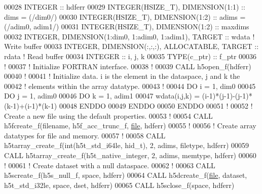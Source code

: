 \begin{DoxyCode}
00028   \textcolor{keywordtype}{INTEGER} :: hdferr
00029   \textcolor{keywordtype}{INTEGER(HSIZE\_T)}, \textcolor{keywordtype}{DIMENSION(1:1)}   :: dims = (/dim0/)
00030   \textcolor{keywordtype}{INTEGER(HSIZE\_T)}, \textcolor{keywordtype}{DIMENSION(1:2)}   :: adims = (/adim0, adim1/)
00031   \textcolor{keywordtype}{INTEGER(HSIZE\_T)}, \textcolor{keywordtype}{DIMENSION(1:2)}   :: maxdims
00032   \textcolor{keywordtype}{INTEGER}, \textcolor{keywordtype}{DIMENSION(1:dim0, 1:adim0, 1:adim1)}, \textcolor{keywordtype}{TARGET} :: wdata \textcolor{comment}{! Write buffer }
00033   \textcolor{keywordtype}{INTEGER}, \textcolor{keywordtype}{DIMENSION(:,:,:)}, \textcolor{keywordtype}{ALLOCATABLE}, \textcolor{keywordtype}{TARGET} :: rdata    \textcolor{comment}{! Read buffer}
00034   \textcolor{keywordtype}{INTEGER} :: i, j, k
00035   \textcolor{keywordtype}{TYPE}(c\_ptr) :: f\_ptr
00036   \textcolor{comment}{!}
00037   \textcolor{comment}{! Initialize FORTRAN interface.}
00038   \textcolor{comment}{!}
00039   \textcolor{keyword}{CALL }h5open\_f(hdferr)
00040   \textcolor{comment}{!}
00041   \textcolor{comment}{! Initialize data.  i is the element in the dataspace, j and k the}
00042   \textcolor{comment}{! elements within the array datatype.}
00043   \textcolor{comment}{!}
00044   \textcolor{keywordflow}{DO} i = 1, dim0
00045      \textcolor{keywordflow}{DO} j = 1, adim0
00046         \textcolor{keywordflow}{DO} k = 1, adim1
00047            wdata(i,j,k) = (i-1)*(j-1)-(j-1)*(k-1)+(i-1)*(k-1)
00048 \textcolor{keywordflow}{        ENDDO}
00049 \textcolor{keywordflow}{     ENDDO}
00050 \textcolor{keywordflow}{  ENDDO}
00051   \textcolor{comment}{!}
00052   \textcolor{comment}{! Create a new file using the default properties.}
00053   \textcolor{comment}{!}
00054   \textcolor{keyword}{CALL }h5fcreate\_f(filename, h5f\_acc\_trunc\_f, \hyperlink{structfile}{file}, hdferr)
00055   \textcolor{comment}{!}
00056   \textcolor{comment}{! Create array datatypes for file and memory.}
00057   \textcolor{comment}{!}
00058   \textcolor{keyword}{CALL }h5tarray\_create\_f(int(h5t\_std\_i64le, hid\_t), 2, adims, filetype, hdferr)
00059   \textcolor{keyword}{CALL }h5tarray\_create\_f(h5t\_native\_integer, 2, adims, memtype, hdferr)
00060   \textcolor{comment}{!}
00061   \textcolor{comment}{! Create dataset with a null dataspace.}
00062   \textcolor{comment}{!}
00063   \textcolor{keyword}{CALL }h5screate\_f(h5s\_null\_f, space, hdferr)
00064   \textcolor{keyword}{CALL }h5dcreate\_f(\hyperlink{structfile}{file}, dataset, h5t\_std\_i32le, space, dset, hdferr)
00065   \textcolor{keyword}{CALL }h5sclose\_f(space, hdferr)

\end{DoxyCode}
